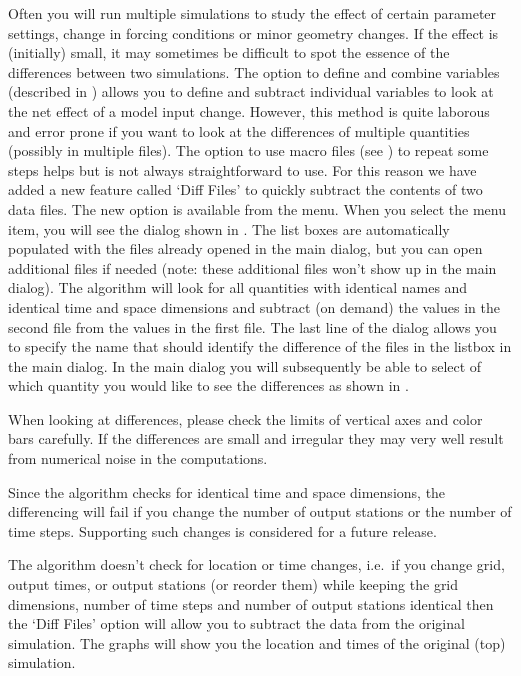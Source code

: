 Often you will run multiple simulations to study the effect of certain parameter settings, change in forcing conditions or minor geometry changes.
If the effect is (initially) small, it may sometimes be difficult to spot the essence of the differences between two simulations.
The option to define and combine variables (described in ) allows you to define and subtract individual variables to look at the net effect of a model input change.
However, this method is quite laborous and error prone if you want to look at the differences of multiple quantities (possibly in multiple files).
The option to use macro files (see ) to repeat some steps helps but is not always straightforward to use.
For this reason we have added a new feature called `Diff Files' to quickly subtract the contents of two data files.
The new option is available from the  menu.
When you select the menu item, you will see the dialog shown in .
The list boxes are automatically populated with the files already opened in the main dialog, but you can open additional files if needed (note: these additional files won't show up in the main dialog).
The algorithm will look for all quantities with identical names and identical time and space dimensions and subtract (on demand) the values in the second file from the values in the first file.
The last line of the dialog allows you to specify the name that should identify the difference of the files in the listbox in the main dialog.
In the main dialog you will subsequently be able to select of which quantity you would like to see the differences as shown in .

\begin{Remark}
\item When looking at differences, please check the limits of vertical axes and color bars carefully.
If the differences are small and irregular they may very well result from numerical noise in the computations.
\item Since the algorithm checks for identical time and space dimensions, the differencing will fail if you change the number of output stations or the number of time steps.
Supporting such changes is considered for a future release.
\item The algorithm doesn't check for location or time changes, i.e.\ if you change grid, output times, or output stations (or reorder them) while keeping the grid dimensions, number of time steps and number of output stations identical then the `Diff Files' option will allow you to subtract the data from the original simulation.
The graphs will show you the location and times of the original (top) simulation.
\end{Remark}

